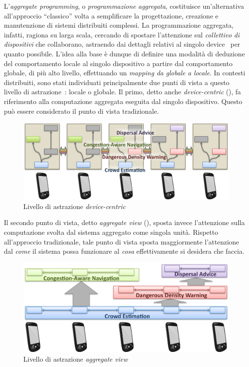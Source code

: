 L'\emph{aggregate programming}, o \emph{programmazione aggregata}, costituisce un'alternativa all'approccio ``classico''
volta a semplificare la progettazione, creazione e manutenzione di sistemi distribuiti complessi.
La programmazione aggregata, infatti, ragiona su larga scala, cercando di spostare l'attenzione sul \emph{collettivo di dispositivi} che collaborano,
astraendo dai dettagli relativi al singolo device~\cite{7274429} per quanto possibile.
L'idea alla base è dunque di definire una modalità di deduzione del comportamento locale al singolo dispositivo a partire dal comportamento globale, di più alto livello,
effettuando un \emph{mapping da globale a locale}.
In contesti distribuiti, sono stati individuati principalmente due punti di vista a questo livello di astrazione~\cite{aggregatescala-pmldc2016}: locale o globale.
Il primo, detto anche \emph{device-centric} (), fa riferimento alla computazione aggregata eseguita dal singolo dispositivo.
Questo può essere considerato il punto di vista tradizionale.

\begin{figure}[htbp]
  \centering
  \includegraphics[width=.55\textwidth]{res/fig/device-centric.png}
  \caption{Livello di astrazione \emph{device-centric}}%
  \label{fig:device-centric}
\end{figure}

Il secondo punto di vista, detto \emph{aggregate view} (), sposta invece l'attenzione sulla computazione svolta dal sistema aggregato come singola unità.
Rispetto all'approccio tradizionale, tale punto di vista sposta maggiormente l'attenzione dal \emph{come} il sistema possa funzionare
al \emph{cosa} effettivamente si desidera che faccia.

\begin{figure}[htbp]
  \centering
  \includegraphics[width=.55\textwidth]{res/fig/aggregate.png}
  \caption{Livello di astrazione \emph{aggregate view}}%
  \label{fig:aggregate}
\end{figure}

